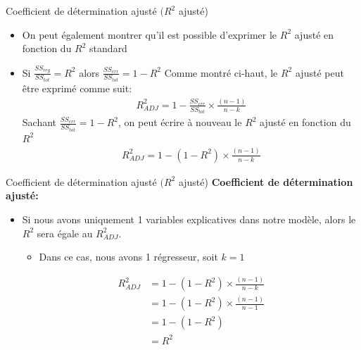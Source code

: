 \documentclass{beamer}
\begin{document}
\begin{frame}{Coefficient de détermination ajusté $(R^2$ ajusté)}
\begin{itemize}
\item On peut également montrer qu'il est possible d'exprimer le $R^2$ ajusté en fonction du $R^2$ standard
\item Si $\frac{SS_{reg}}{SS_{tot}}=R^2$ alors $\frac{SS_{err}}{SS_{tot}}=1-R^2$
Comme montré ci-haut, le $R^2$ ajusté peut être exprimé comme suit:
\begin{align*}
R_{ADJ}^2=1-\frac{SS_{err}}{SS_{tot}} \times \frac{(n-1)}{n-k}
\end{align*}
Sachant $\frac{SS_{err}}{SS_{tot}}=1-R^2$, on peut écrire à nouveau le $R^2$ ajusté en fonction du $R^2$
\begin{align*}
R_{ADJ}^2=1-(1-R^2) \times \frac{(n-1)}{n-k}
\end{align*}
\end{itemize}
\end{frame}

\begin{frame}{Coefficient de détermination ajusté $(R^2$ ajusté)}
\textbf{Coefficient de détermination ajusté:}

\begin{itemize}
\item Si nous avons uniquement 1 variables explicatives dans notre modèle, alors le $R^2$ sera égale au $R_{ADJ}^2$.
\begin{itemize}
\item Dans ce cas, nous avons 1 régresseur, soit $k=1$
\end{itemize}
\begin{align*}
R_{ADJ}^2 & =1-(1-R^2) \times \frac{(n-1)}{n-k} \\ & = 1-(1-R^2) \times \frac{(n-1)}{n-1} \\ & =1-(1-R^2) \\ & = R^2
\end{align*}
\end{itemize}
\end{frame}
\end{document}

